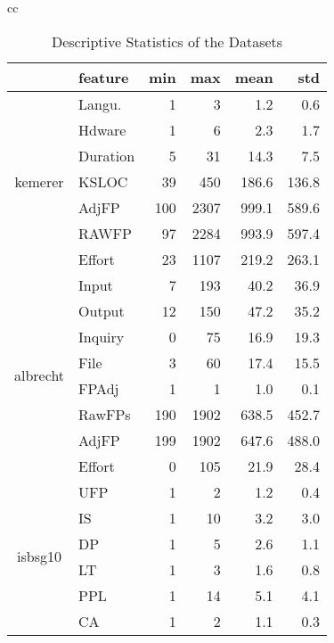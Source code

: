 \begin{table*}[t!]
\caption{Descriptive Statistics of the Datasets}\label{table:dataset}
\renewcommand{\baselinestretch}{0.75} 
\centering
\begin{tabular}{cc}
\scriptsize
\begin{tabular}{|c|l|rrrr|}
    \hline
      & feature & min  & max & mean & std\\
   \hline


\multirow{7}{*}{\begin{sideways}kemerer\end{sideways}}
& Langu. & 1 & 3 & 1.2 & 0.6\\
& Hdware & 1 & 6 & 2.3 & 1.7\\
& Duration & 5 & 31 & 14.3 & 7.5\\
& KSLOC & 39 & 450 & 186.6 & 136.8\\
& AdjFP & 100 & 2307 & 999.1 & 589.6\\
& RAWFP & 97 & 2284 & 993.9 & 597.4\\
& Effort & 23 & 1107 & 219.2 & 263.1\\
\hline
\multirow{8}{*}{\begin{sideways}albrecht\end{sideways}}
& Input & 7 & 193 & 40.2 & 36.9\\
& Output & 12 & 150 & 47.2 & 35.2\\
& Inquiry & 0 & 75 & 16.9 & 19.3\\
& File & 3 & 60 & 17.4 & 15.5\\
& FPAdj & 1 & 1 & 1.0 & 0.1\\
& RawFPs & 190 & 1902 & 638.5 & 452.7\\
& AdjFP & 199 & 1902 & 647.6 & 488.0\\
& Effort & 0 & 105 & 21.9 & 28.4\\
\hline
\multirow{12}{*}{\begin{sideways}isbsg10\end{sideways}}
& UFP & 1 & 2 & 1.2 & 0.4\\
& IS & 1 & 10 & 3.2 & 3.0\\
& DP & 1 & 5 & 2.6 & 1.1\\
& LT & 1 & 3 & 1.6 & 0.8\\
& PPL & 1 & 14 & 5.1 & 4.1\\
& CA & 1 & 2 & 1.1 & 0.3\\

\end{tabular}
\end{tabular}
\end{table*}
